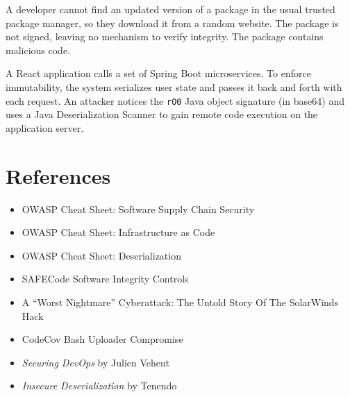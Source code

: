 \documentclass[11pt]{article}
\begin{document}
\begin{scenario}
A developer cannot find an updated version of a package in the usual trusted package manager, so they download it from a random website. The package is not signed, leaving no mechanism to verify integrity. The package contains malicious code.
\end{scenario}

\begin{scenario}
A React application calls a set of Spring Boot microservices. To enforce immutability, the system serializes user state and passes it back and forth with each request. An attacker notices the \texttt{rO0} Java object signature (in base64) and uses a Java Deserialization Scanner to gain remote code execution on the application server.
\end{scenario}

\section{References}
\begin{itemize}
  \item OWASP Cheat Sheet: Software Supply Chain Security
  \item OWASP Cheat Sheet: Infrastructure as Code
  \item OWASP Cheat Sheet: Deserialization
  \item SAFECode Software Integrity Controls
  \item A ``Worst Nightmare'' Cyberattack: The Untold Story Of The SolarWinds Hack
  \item CodeCov Bash Uploader Compromise
  \item \textit{Securing DevOps} by Julien Vehent
  \item \textit{Insecure Deserialization} by Tenendo
\end{itemize}

\newpage
\end{document}
